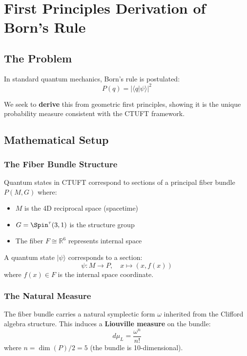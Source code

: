 \section{First Principles Derivation of Born's Rule}
\label{app:born_rule_derivation}

\subsection{The Problem}

In standard quantum mechanics, Born's rule is postulated:
\begin{equation}
    P(q) = |\langle q|\psi\rangle|^2
\end{equation}

We seek to \textbf{derive} this from geometric first principles, showing it is the unique probability measure consistent with the CTUFT framework.

\subsection{Mathematical Setup}

\subsubsection{The Fiber Bundle Structure}

Quantum states in CTUFT correspond to sections of a principal fiber bundle $P(M, G)$ where:
\begin{itemize}
    \item $M$ is the 4D reciprocal space (spacetime)
    \item $G = \Spin^\tau(3,1)$ is the structure group
    \item The fiber $F \cong \mathbb{R}^6$ represents internal space
\end{itemize}

A quantum state $|\psi\rangle$ corresponds to a section:
\begin{equation}
    \psi: M \to P, \quad x \mapsto (x, f(x))
\end{equation}
where $f(x) \in F$ is the internal space coordinate.

\subsubsection{The Natural Measure}

The fiber bundle carries a natural symplectic form $\omega$ inherited from the Clifford algebra structure. This induces a \textbf{Liouville measure} on the bundle:
\begin{equation}
    d\mu_L = \frac{\omega^n}{n!}
\end{equation}
where $n = \dim(P)/2 = 5$ (the bundle is 10-dimensional).

